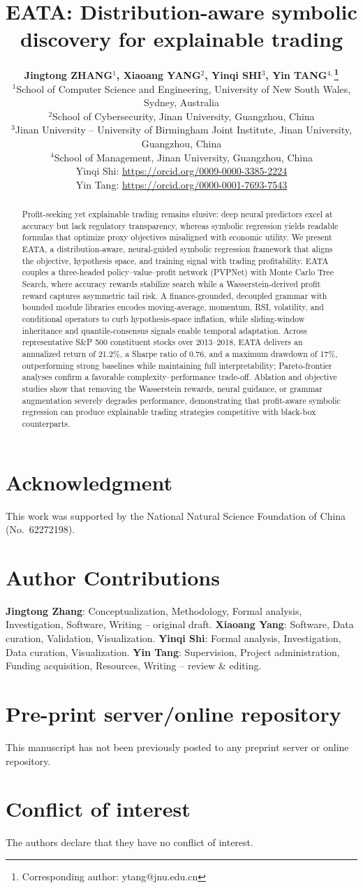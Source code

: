 \documentclass{elektr}
\title{
EATA: Distribution-aware symbolic discovery for explainable trading
}
\author[Jingtong ZHANG and others]{
	\textbf{Jingtong ZHANG$^{1}$, Xiaoang YANG$^{2}$, Yinqi SHI$^{3}$, Yin TANG$^{4,}$\thanks{Corresponding author: ytang@jnu.edu.cn}}\\
	$^{1}$School of Computer Science and Engineering, University of New South Wales, Sydney, Australia\\
	$^{2}$School of Cybersecurity, Jinan University, Guangzhou, China\\
	$^{3}$Jinan University -- University of Birmingham Joint Institute, Jinan University, Guangzhou, China\\
	$^{4}$School of Management, Jinan University, Guangzhou, China\\
	Yinqi Shi: \url{https://orcid.org/0009-0000-3385-2224} \\
	Yin Tang: \url{https://orcid.org/0000-0001-7693-7543} \\ [1.8em]

\rec{...}
\acc{...}
\finv{...}
}
\begin{document}
	\maketitle

	\begin{abstract}
		Profit-seeking yet explainable trading remains elusive: deep neural predictors excel at accuracy but lack regulatory transparency, whereas symbolic regression yields readable formulas that optimize proxy objectives misaligned with economic utility. We present EATA, a distribution-aware, neural-guided symbolic regression framework that aligns the objective, hypothesis space, and training signal with trading profitability. EATA couples a three-headed policy--value--profit network (PVPNet) with Monte Carlo Tree Search, where accuracy rewards stabilize search while a Wasserstein-derived profit reward captures asymmetric tail risk. A finance-grounded, decoupled grammar with bounded module libraries encodes moving-average, momentum, RSI, volatility, and conditional operators to curb hypothesis-space inflation, while sliding-window inheritance and quantile-consensus signals enable temporal adaptation. Across representative S\&P 500 constituent stocks over 2013--2018, EATA delivers an annualized return of 21.2\%, a Sharpe ratio of 0.76, and a maximum drawdown of 17\%, outperforming strong baselines while maintaining full interpretability; Pareto-frontier analyses confirm a favorable complexity--performance trade-off. Ablation and objective studies show that removing the Wasserstein rewards, neural guidance, or grammar augmentation severely degrades performance, demonstrating that profit-aware symbolic regression can produce explainable trading strategies competitive with black-box counterparts.

	\end{abstract}

\section*{Acknowledgment}
This work was supported by the National Natural Science Foundation of China (No.~62272198).

\section*{Author Contributions}
\textbf{Jingtong Zhang}: Conceptualization, Methodology, Formal analysis, Investigation, Software, Writing -- original draft.
\textbf{Xiaoang Yang}: Software, Data curation, Validation, Visualization.
\textbf{Yinqi Shi}: Formal analysis, Investigation, Data curation, Visualization.
\textbf{Yin Tang}: Supervision, Project administration, Funding acquisition, Resources, Writing -- review \& editing.

\section*{Pre-print server/online repository}
This manuscript has not been previously posted to any preprint server or online repository.

\section*{Conflict of interest}
The authors declare that they have no conflict of interest.
\end{document}
